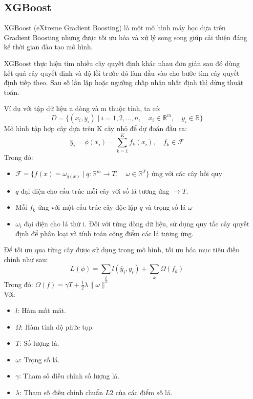 \documentclass[conference]{IEEEtran}
\begin{document}
\subsection{XGBoost}
XGBoost (eXtreme Gradient Boosting) là một mô hình máy học dựa trên  Gradient Boosting nhưng được tối ưu hóa và xử lý song song giúp cải thiện đáng kể thời gian đào tạo mô hình. \cite{XGBoost}

XGBoost thực hiện tìm nhiều cây quyết định khác nhau đơn giản sau đó dùng kết quả cây quyết định và độ lỗi trước đó làm đầu vào cho bước tìm cây quyết định tiếp theo. Sau số lần lặp hoặc ngưỡng chấp nhận nhất định thì dừng thuật toán. \cite{XGBoost}

Ví dụ với tập dữ liệu n dòng và m thuộc tính, ta có:
\[
D = \{(x_i, y_i) \mid i = 1, 2, \ldots, n, \quad x_i \in \mathbb{R}^m, \quad y_i \in \mathbb{R}\}
\]
Mô hình tập hợp cây dựa trên K cây nhỏ để dự đoán đầu ra:
\[
\hat{y}_i = \phi(x_i) = \sum_{k=1}^{K} f_k(x_i), \quad f_k \in \mathcal{F}
\]
Trong đó:
\begin{itemize}
    \item \(\mathcal{F} = \{ f(x) = \omega_{q(x)} \mid q: \mathbb{R}^m \rightarrow T, \quad \omega \in \mathbb{R}^T \}\) ứng với các cây hồi quy
    \item \(q\) đại diện cho cấu trúc mỗi cây với số lá tương ứng \(\rightarrow T\). 
    \item Mỗi \(f_k\) ứng với một cấu trúc cây độc lập \(q\) và trọng số lá \(\omega\)
    \item \(\omega_i\) đại diện cho lá thứ i. Đối với từng dòng dữ liệu, sử dụng quy tắc cây quyết định để phân loại và tính toán cộng điểm các lá tương ứng.
\end{itemize}
Để tối ưu qua từng cây được sử dụng trong mô hình, tối ưu hóa mục tiêu điều chỉnh như sau:
\[
L(\phi) = \sum_{i} l(\hat{y}_i, y_i) + \sum_{k} \Omega(f_k)
\]
Trong đó: \(\Omega(f) = \gamma T + \frac{1}{2} \lambda \|\omega\|^2\) \\
Với: 
\begin{itemize}
    \item \( l \): Hàm mất mát.
    \item \( \Omega \): Hàm tính độ phức tạp.
    \item \( T \): Số lượng lá.
    \item \( \omega \): Trọng số lá.
    \item \( \gamma \): Tham số điều chỉnh số lượng lá.
    \item \( \lambda \): Tham số điều chỉnh chuẩn \( L2 \) của các điểm số lá.
\end{itemize}
\end{document}
